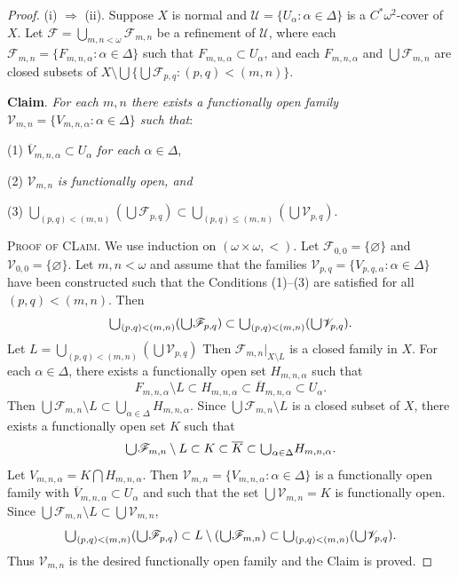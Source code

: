 \documentclass[jisng5i.tex]{subfiles}
\begin{document}
\begin{proof}
 (i) $\Rightarrow$ (ii). Suppose $X$ is normal and $\mathscr{U}=\{U_\alpha: \alpha\in\Delta\}$ is a  $C^*\omega^2$-cover of $X$. 
 Let $\mathscr{F} = \bigcup_{m,n < \omega} \mathscr{F}_{m,n}$ 
 be a refinement of $\mathscr{U}$,
where each $\mathscr{F}_{m,n} = \{F_{m,n,\alpha}: \alpha\in\Delta\}$ 
such that $F_{m,n,\alpha}\subset U_\alpha$, and each $F_{m,n,\alpha}$  and
$\bigcup \mathscr{F}_{m,n}$ are  closed subsets of 
$X\setminus\bigcup\{\bigcup\mathscr{F}_{p,q}: (p, q) < (m, n)\}$.

\textbf{Claim}. \textit{For each $m,n$ there exists a functionally open family 
$\mathscr{V}_{m,n} = \{V_{m,n,\alpha}: \alpha\in\Delta\}$ such that}:

(1) $\overline{V}_{m,n,\alpha} \subset U_\alpha$ \textit{ for each } $\alpha\in\Delta$,

(2) $\mathscr{V}_{m,n}$ \textit{ is functionally open, and}

(3) $\bigcup_{(p,q)<(m,n)} (\bigcup \mathscr{F}_{p,q}) \subset \bigcup_{(p,q)\le(m,n)} (\bigcup \mathscr{V}_{p,q})$.

\noindent\textsc{Proof of CLaim}. We use induction on $(\omega\times\omega, <)$. 
Let $\mathscr{F}_{0,0} = \{\varnothing\}$ and $\mathscr{V}_{0,0} = \{\varnothing\}$.
Let $m,n < \omega$ and assume that the families $\mathscr{V}_{p,q} 
= \{V_{p,q,\alpha}: \alpha\in\Delta\}$ have 
been constructed such that the Conditions (1)–(3) are satisfied for all $(p,q) < (m,n)$. 
Then
$$\raisebox{-2pt}{\scalebox{1.5}{$\cup$}}_{(p,q) < (m,n)} (\raisebox{-2pt}{\scalebox{1.5}{$\cup$}} 
\mathscr{F}_{p,q}) \subset \raisebox{-2pt}{\scalebox{1.5}{$\cup$}}_{(p,q) < (m,n)} 
(\raisebox{-2pt}{\scalebox{1.5}{$\cup$}} \mathscr{V}_{p,q}).$$
Let $L = \bigcup_{(p,q)<(m,n)} (\bigcup \mathscr{V}_{p,q})$
Then $\mathscr{F}_{m,n}|_{X\setminus L}$ is a closed family in $X$. 
For each $\alpha\in\Delta$, there exists a functionally open set $H_{m,n,\alpha}$ such that
$$F_{m,n,\alpha} \setminus L \subset H_{m,n,\alpha} \subset \overline{H}_{m,n,\alpha} \subset U_\alpha.$$
Then
$\bigcup \mathscr{F}_{m,n} \setminus L \subset \bigcup_{\alpha \in\Delta} H_{m,n,\alpha}$. 
Since $\bigcup \mathscr{F}_{m,n} \setminus L$ is a closed subset of $X$, there exists a 
functionally open set $K$ such that
$$\raisebox{-2pt}{\scalebox{1.5}{$\cup$}} \mathscr{F}_{m,n} \setminus L \subset K \subset \overline{K} \subset 
\raisebox{-2pt}{\scalebox{1.5}{$\cup$}}_{\alpha \in \Delta} H_{m,n,\alpha}.$$
Let $V_{m,n,\alpha} = K\bigcap H_{m,n,\alpha}$. 
Then $\mathscr{V}_{m,n} = \{V_{m,n,\alpha}: \alpha \in \Delta\}$ is a functionally open 
family with $\overline{{V}}_{m,n,\alpha} \subset U_\alpha$ and such that the set
$\bigcup \mathscr{V}_{m,n} = K$ is functionally open. Since 
$\bigcup \mathscr{F}_{m,n} \setminus L \subset \bigcup \mathscr{V}_{m,n}$,
$$\raisebox{-2pt}{\scalebox{1.5}{$\cup$}}_{(p,q) < (m,n)}(\raisebox{-2pt}{\scalebox{1.5}{$\cup$}}\mathscr{F}_{p,q}) \subset L \setminus (\raisebox{-2pt}{\scalebox{1.5}{$\cup$}}\mathscr{F}_{m,n})
\subset \raisebox{-2pt}{\scalebox{1.5}{$\cup$}}_{(p,q) < (m,n)}(\raisebox{-2pt}{\scalebox{1.5}{$\cup$}}\mathscr{V}_{p,q}).$$
Thus $\mathscr{V}_{m,n}$ is the desired functionally open family and the Claim is proved.


\end{proof}
\end{document}
